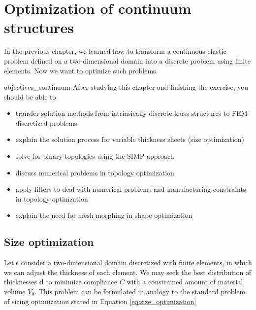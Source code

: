 \chapter{Optimization of continuum structures}
In the previous chapter, we learned how to transform a continuous elastic problem defined on a two-dimensional domain into a discrete problem using finite elements. Now we want to optimize such problems.

\begin{objectives}{}{objectives_continuum}
After studying this chapter and finishing the exercise, you should be able to 
\begin{itemize}[label=$\dots$]
    \item transfer solution methods from intrinsically discrete truss structures to FEM-discretized problems
    \item explain the solution process for variable thickness sheets (size optimization) 
    \item solve for binary topologies using the SIMP approach
    \item discuss numerical problems in topology optimization
    \item apply filters to deal with numerical problems and manufacturing constraints in topology optimzation
    \item explain the need for mesh morphing in shape optimization
\end{itemize}
\end{objectives}

\section{Size optimization}
\label{sec:variable_thickness_sheet}
Let's consider a two-dimensional domain discretized with finite elements, in which we can adjust the thickness of each element. We may seek the best distribution of thicknesses $\mathbf{d}$ to minimize compliance $C$ with a constrained amount of material volume $V_0$. This problem can be formulated in analogy to the standard problem of sizing optimization stated in Equation \eqref{eq:size_optimization}

